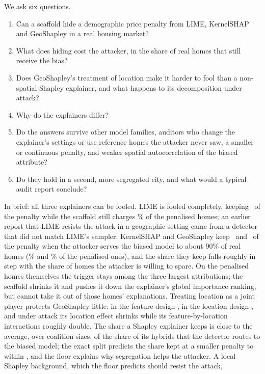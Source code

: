 \documentclass[11pt]{article}
\newcommand{\1}{\mathbf{1}}
\begin{document}
We ask six questions.
\begin{enumerate}
  \item Can a scaffold hide a demographic price penalty from LIME, KernelSHAP and GeoShapley in a real housing market?
  \item What does hiding cost the attacker, in the share of real homes that still receive the bias?
  \item Does GeoShapley's treatment of location make it harder to fool than a non-spatial Shapley explainer, and what
        happens to its decomposition under attack?
  \item Why do the explainers differ?
  \item Do the answers survive other model families, auditors who change the explainer's settings or use reference
        homes the attacker never saw, a smaller or continuous penalty, and weaker spatial autocorrelation of the
        biased attribute?
  \item Do they hold in a second, more segregated city, and what would a typical audit report conclude?
\end{enumerate}
In brief: all three explainers can be fooled. LIME is fooled completely, keeping \FLIMEMatKept\ of the penalty while
the scaffold still charges \FLIMEMatFidPen\% of the penalised homes; an earlier report that LIME resists the attack in
a geographic setting came from a detector that did not match LIME's sampler. KernelSHAP and GeoShapley keep
\FKernelSHAPMatKept\ and \FGeoShapleyMatKept\ of the penalty when the attacker serves the biased model to about 90\%
of real homes (\FKernelSHAPMatFidPen\% and \FGeoShapleyMatFidPen\% of the penalised ones), and the share they keep
falls roughly in step with the share of homes the attacker is willing to spare. On the penalised homes themselves the
trigger stays among the three largest attributions; the scaffold shrinks it and pushes it down the explainer's global
importance ranking, but cannot take it out of those homes' explanations. Treating location as a joint player protects
GeoShapley little: in the feature design \FCtwoClause, in the location design \LCtwoClause, and under attack its
location effect shrinks while its feature-by-location interactions roughly double. The share a Shapley explainer keeps
is close to the average, over coalition sizes, of the share of its hybrids that the detector routes to the biased
model; the exact split predicts the share kept at a smaller penalty to within \SplitPredTenMax, and the floor explains
why segregation helps the attacker. A local Shapley background, which the floor predicts should resist the attack,
\end{document}
